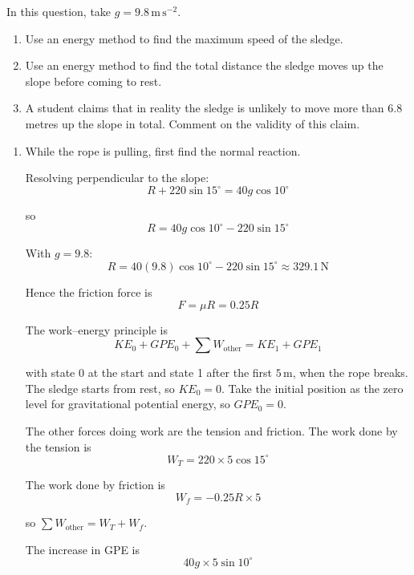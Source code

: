 \documentclass[leqno]{article}
\begin{document}
\begin{enumerate}[
  label=\textbf{\arabic*.},
  leftmargin=*,
  topsep=0pt,
  partopsep=0pt,
  parsep=0pt
]
In this question, take $g = 9.8\,\mathrm{m\,s^{-2}}$. \\

\begin{enumerate}[label=\textbf{(\alph*)}]
  \item Use an energy method to find the maximum speed of the sledge.  \\
  \item Use an energy method to find the total distance the sledge moves up the slope before coming to rest.  \\
  \item A student claims that in reality the sledge is unlikely to move more than $6.8$ metres up the slope in total. Comment on the validity of this claim.  \\
\end{enumerate}

\vspace*{10pt}

\begin{djsSolution}
\begin{enumerate}[label=\textbf{(\alph*)}]
  \item While the rope is pulling, first find the normal reaction.

  Resolving perpendicular to the slope:
  \[
  R + 220\sin 15^\circ = 40g\cos 10^\circ
  \]

  so
  \[
  R = 40g\cos 10^\circ - 220\sin 15^\circ
  \]

  With \(g=9.8\):
  \[
  R = 40(9.8)\cos 10^\circ - 220\sin 15^\circ \approx 329.1\,\mathrm{N}
  \]

  Hence the friction force is
  \[
  F=\mu R=0.25R
  \]

  The work--energy principle is
  \[
  KE_0+GPE_0+\sum W_{\text{other}}=KE_1+GPE_1
  \]

  with state 0 at the start and state 1 after the first \(5\,\mathrm{m}\), when the rope breaks. The sledge starts from rest, so \(KE_0=0\). Take the initial position as the zero level for gravitational potential energy, so \(GPE_0=0\).

  The other forces doing work are the tension and friction. The work done by the tension is
  \[
  W_T=220\times 5\cos 15^\circ
  \]

  The work done by friction is
  \[
  W_f=-0.25R\times 5
  \]

  so \(\sum W_{\text{other}}=W_T+W_f\).

  The increase in GPE is
  \[
  40g\times 5\sin 10^\circ
  \]


\end{enumerate}
\end{djsSolution}
\end{enumerate}
\end{document}
